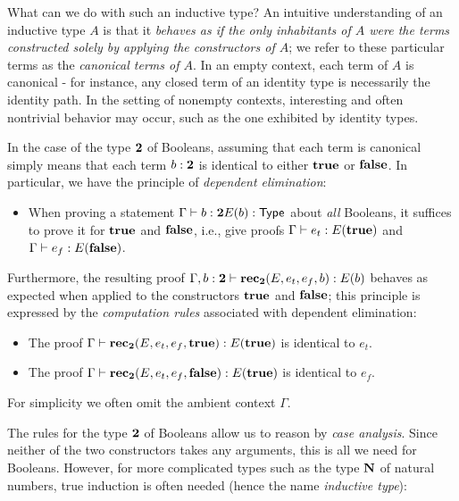 What can we do with such an inductive type? An intuitive understanding of an inductive type $A$ is that it \emph{behaves as if the only inhabitants of $A$ were the terms constructed solely by applying the constructors of $A$}; we refer to these particular terms as the \emph{canonical terms of $A$}. In an empty context,
each term of $A$ is canonical - for instance, any closed term of an identity type is necessarily the identity path. In the setting of nonempty contexts,  
interesting and often nontrivial behavior may occur, such as the one exhibited by identity types.

In the case of the type $\mathbf{2}$ of Booleans, assuming that each term is canonical simply means that each term $b : \mathbf{2}$ is identical to either $\mathbf{true}$ or $\mathbf{false}$. In particular, we have the principle of \emph{dependent elimination}:

\begin{itemize}
\item When proving a statement $\Gamma \vdash b : \mathbf{2} E(b) : \mathsf{Type}$ about \emph{all} Booleans, it suffices to prove it for $\mathbf{true}$ and $\mathbf{false}$, i.e., give proofs
$\Gamma \vdash e_t : E(\mathbf{true})$ and $\Gamma \vdash e_f : E(\mathbf{false})$.
\end{itemize}

Furthermore, the resulting proof $\Gamma, b : \mathbf{2} \vdash \mathbf{rec}_\mathbf{2}(E,e_t,e_f,b): E(b)$ behaves as expected when applied to the constructors $\mathbf{true}$ and $\mathbf{false}$; this principle is expressed by the \emph{computation rules} associated with dependent elimination:
\begin{itemize}
\item The proof $\Gamma \vdash \mathbf{rec}_\mathbf{2}(E,e_t,e_f,\mathbf{true}) : E(\mathbf{true})$ is identical to $e_t$.
\item The proof $\Gamma \vdash \mathbf{rec}_\mathbf{2}(E,e_t,e_f,\mathbf{false}) : E(\mathbf{true})$ is identical to $e_f$.
\end{itemize}
For simplicity we often omit the ambient context $\Gamma$.

The rules for the type $\mathbf{2}$ of Booleans allow us to reason by \emph{case analysis}. Since neither of the two constructors takes any arguments, this is all we need for Booleans. However, for more complicated types such as the type $\mathbf{N}$ of natural numbers, true induction is often needed (hence the name \emph{inductive type}):

